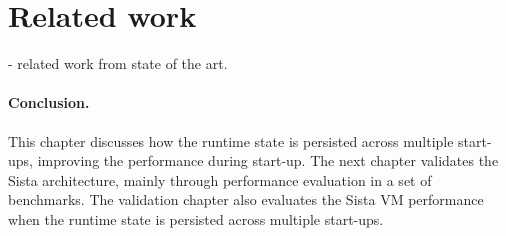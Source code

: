 \documentclass[a4paper,12pt,twoside]{../includes/ThesisStyle}
\begin{document}
\section{Related work}
\label{sec:relWork}

- related work
from state of the art.

\paragraph{Conclusion.} This chapter discusses how the runtime state is persisted across multiple start-ups, improving the performance during start-up. The next chapter validates the Sista architecture, mainly through performance evaluation in a set of benchmarks. The validation chapter also evaluates the Sista VM performance when the runtime state is persisted across multiple start-ups.

\ifx\wholebook\relax\else
    
\end{document}
